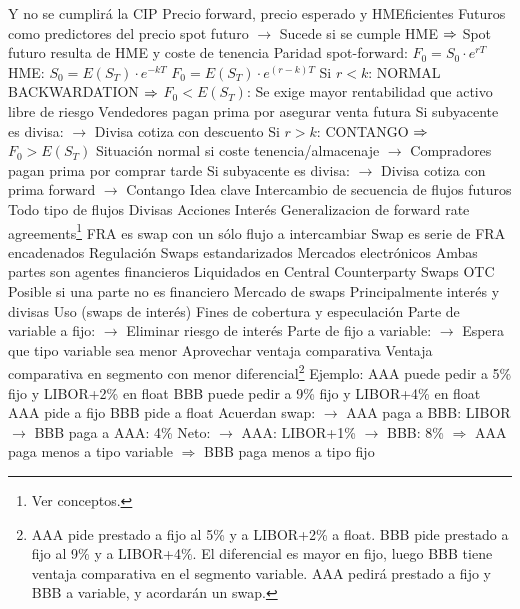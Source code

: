\documentclass{nuevotema}
\begin{document}
\begin{esquemal}
				\4[] Y no se cumplirá la CIP
			\3 Precio forward, precio esperado y HMEficientes
				\4 Futuros como predictores del precio spot futuro
				\4[] $\to$ Sucede si se cumple HME
				\4[] $\then$ Spot futuro resulta de HME y coste de tenencia
				\4 Paridad spot-forward:
				\4[] $F_0 = S_0 \cdot e^{rT}$
				\4 HME:
				\4[] $S_0 = E(S_T) \cdot e^{-kT}$
				\4[$\then$] $F_0 = E(S_T) \cdot e^{(r-k)T}$
				\4 Si $r <k$: NORMAL BACKWARDATION
				\4[] $\then$ $F_0 < E(S_T)$:
				\4[] Se exige mayor rentabilidad que activo libre de riesgo
				\4[] Vendedores pagan prima por asegurar venta futura
				\4[] Si subyacente es divisa:
				\4[] $\to$ Divisa cotiza con descuento
				\4 Si $r > k$: CONTANGO
				\4[] $\then$ $F_0 > E(S_T)$
				\4[] Situación normal si coste tenencia/almacenaje
				\4[] $\to$ Compradores pagan prima por comprar tarde
				\4[] Si subyacente es divisa:
				\4[] $\to$ Divisa cotiza con prima forward
				\4[] $\to$ Contango
	\1 
		\2 Idea clave
			\3 Intercambio de secuencia de flujos futuros
				\4 Todo tipo de flujos
				\4[] Divisas
				\4[] Acciones
				\4[] Interés
				\4[$\to$] Generalizacion de forward rate agreements\footnote{Ver conceptos.}
				\4[] FRA es swap con un sólo flujo a intercambiar
				\4[] Swap es serie de FRA encadenados
			\3 Regulación
				\4 Swaps estandarizados
				\4[] Mercados electrónicos
				\4[] Ambas partes son agentes financieros
				\4[] Liquidados en Central Counterparty
				\4 Swaps OTC
				\4[] Posible si una parte no es financiero
			\3 Mercado de swaps
				\4 Principalmente interés y divisas
		\2 Uso (swaps de interés)
			\3 Fines de cobertura y especulación
				\4 Parte de variable a fijo:
				\4[] $\to$ Eliminar riesgo de interés
				\4 Parte de fijo a variable:
				\4[] $\to$ Espera que tipo variable sea menor
			\3 Aprovechar ventaja comparativa
				\4 Ventaja comparativa en segmento con menor diferencial\footnote{AAA pide prestado a fijo al 5\% y a LIBOR+2\% a float. BBB pide prestado a fijo al 9\% y a LIBOR+4\%. El diferencial es mayor en fijo, luego BBB tiene ventaja comparativa en el segmento variable. AAA pedirá prestado a fijo y BBB a variable, y acordarán un swap.}
				\4 Ejemplo:
				\4[] AAA puede pedir a 5\% fijo y LIBOR+2\% en float
				\4[] BBB puede pedir a 9\% fijo y LIBOR+4\% en float
				\4[] AAA pide a fijo
				\4[] BBB pide a float
				\4[] Acuerdan swap:
				\4[] $\to$ AAA paga a BBB: LIBOR
				\4[] $\to$ BBB paga a AAA: 4\%
				\4[] Neto:
				\4[] $\to$ AAA: LIBOR+1\%
				\4[] $\to$ BBB: 8\%
				\4[] $\Rightarrow$ AAA paga menos a tipo variable
				\4[] $\Rightarrow$ BBB paga menos a tipo fijo

\end{esquemal}
\end{document}
